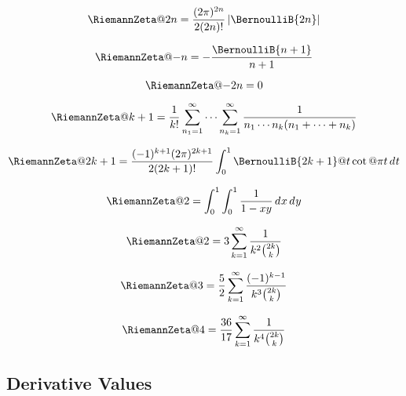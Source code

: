 \documentclass{article}
\begin{document}
\begin{equation}\label{eq:ZE.INA.INT5}%
  \RiemannZeta@{2n}
  = \frac{(2\cpi)^{2n}}{2(2n)!} \left| \BernoulliB{2n} \right|
\end{equation}

\begin{equation}\label{eq:ZE.INA.INT6}%
  \RiemannZeta@{-n} = -\frac{\BernoulliB{n+1}}{n+1}
\end{equation}

\begin{equation}\label{eq:ZE.INA.INT7}%
  \RiemannZeta@{-2n} = 0
\end{equation}

\begin{equation}\label{eq:ZE.INA.INT8}%
  \RiemannZeta@{k+1}
  = \frac{1}{k!}
    \sum_{n_1=1}^\infty \dots \sum_{n_k=1}^\infty
        \frac{1}{n_1 \cdots n_k (n_1 + \dots + n_k)}
\end{equation}

\begin{equation}\label{eq:ZE.INA.INT9}%
  \RiemannZeta@{2k+1}
  = \frac{\opminus^{k+1} (2 \cpi)^{2k+1}}{2(2k+1)!}
    \int_0^1 \BernoulliB{2k+1}@{t} \cot@{\cpi t} \diff{t}
\end{equation}

\begin{equation}\label{eq:ZE.INA.INT10}%
  \RiemannZeta@{2}
  = \int_0^1 \int_0^1 \frac{1}{1-xy} \diff{x} \diff{y}
\end{equation}

\begin{equation}\label{eq:ZE.INA.INT11}%
  \RiemannZeta@{2}
  = 3 \sum_{k=1}^\infty \frac{1}{k^2 \binom{2k}{k}}
\end{equation}

\begin{equation}\label{eq:ZE.INA.INT12}%
  \RiemannZeta@{3}
  = \frac{5}{2} \sum_{k=1}^\infty \frac{\opminus^{k-1}}{k^3 \binom{2k}{k}}
\end{equation}

\begin{equation}\label{eq:ZE.INA.INT13}%
  \RiemannZeta@{4}
  = \frac{36}{17} \sum_{k=1}^\infty \frac{1}{k^4 \binom{2k}{k}}
\end{equation}

\subsection{Derivative Values}\label{sec:ZE.INA.DER}
\end{document}
